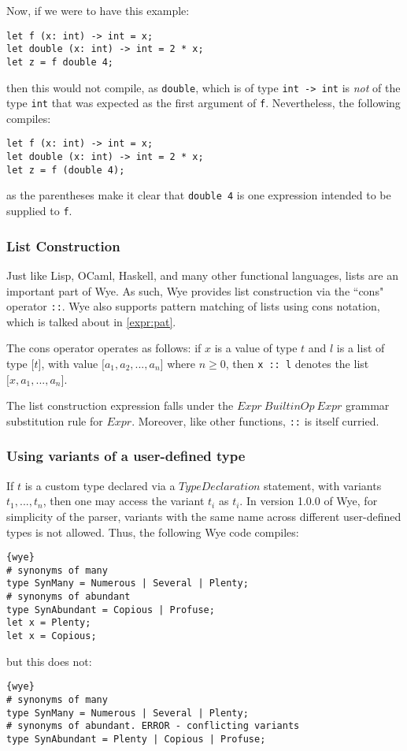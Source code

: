 \documentclass[a4paper, 12pt]{article}
\newcommand{\version}{1.0.0}
\begin{document}
Now, if we were to have this example:
\begin{lstlisting}
let f (x: int) -> int = x;
let double (x: int) -> int = 2 * x;
let z = f double 4;
\end{lstlisting}
then this would not compile, as \texttt{double}, which is of type \texttt{int -> int} is \textit{not} of the type \texttt{int} that was expected as the first argument of \texttt{f}. Nevertheless, the following compiles:
\begin{lstlisting}
let f (x: int) -> int = x;
let double (x: int) -> int = 2 * x;
let z = f (double 4);
\end{lstlisting}
as the parentheses make it clear that \texttt{double 4} is one expression intended to be supplied to \texttt{f}.

\subsubsection{List Construction}\label{expr:cons}
Just like Lisp, OCaml, Haskell, and many other functional languages, lists are an important part of Wye. As such, Wye provides list construction via the ``cons" operator \texttt{::}. Wye also supports pattern matching of lists using cons notation, which is talked about in \ref{expr:pat}.

The cons operator operates as follows: if $x$ is a value of type $t$ and $l$ is a list of type $\texttt{[}t\texttt{]}$, with value $\texttt{[}a_1, a_2, ..., a_n\texttt{]}$ where $n\geq 0$, then \texttt{x :: l} denotes the list $\texttt{[}x, a_1, ..., a_n\texttt{]}$.

The list construction expression falls under the $Expr\: BuiltinOp\: Expr$ grammar substitution rule for $Expr$. Moreover, like other functions, \texttt{::} is itself curried.

\subsubsection{Using variants of a user-defined type}
If $t$ is a custom type declared via a $TypeDeclaration$ statement, with variants $t_1, ..., t_n$, then one may access the variant $t_i$ as $t_i$. In version \version{} of Wye, for simplicity of the parser, variants with the same name across different user-defined types is not allowed. Thus, the following Wye code compiles:
\begin{lstlisting}{wye}
# synonyms of many
type SynMany = Numerous | Several | Plenty;
# synonyms of abundant
type SynAbundant = Copious | Profuse;
let x = Plenty;
let x = Copious;
\end{lstlisting}
but this does not:
\begin{lstlisting}{wye}
# synonyms of many
type SynMany = Numerous | Several | Plenty;
# synonyms of abundant. ERROR - conflicting variants
type SynAbundant = Plenty | Copious | Profuse;
\end{lstlisting}
\end{document}
